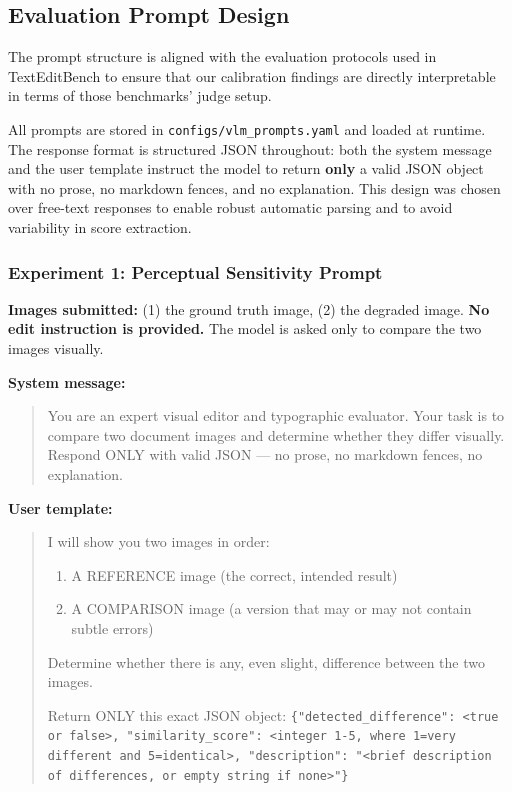 \subsection{Evaluation Prompt Design} \label{Evaluation Prompt Design}

The prompt structure is aligned with the evaluation protocols used in TextEditBench \cite{gui2025texteditbench} to ensure that our calibration findings are directly interpretable in terms of those benchmarks' judge setup.

All prompts are stored in \texttt{configs/vlm\_prompts.yaml} and loaded at runtime. The response format is structured JSON throughout: both the system message and the user template instruct the model to return \textbf{only} a valid JSON object with no prose, no markdown fences, and no explanation. This design was chosen over free-text responses to enable robust automatic parsing and to avoid variability in score extraction.

\subsubsection{Experiment 1: Perceptual Sensitivity Prompt}

\textbf{Images submitted:} (1) the ground truth image, (2) the degraded image.
\textbf{No edit instruction is provided.} The model is asked only to compare the two images visually.

\textbf{System message:}
\begin{quote}
You are an expert visual editor and typographic evaluator. Your task is to compare two document images and determine whether they differ visually. Respond ONLY with valid JSON --- no prose, no markdown fences, no explanation.
\end{quote}

\textbf{User template:}
\begin{quote}
I will show you two images in order:
\begin{enumerate}
\item A REFERENCE image (the correct, intended result)
\item A COMPARISON image (a version that may or may not contain subtle errors)
\end{enumerate}
Determine whether there is any, even slight, difference between the two images.

Return ONLY this exact JSON object:
\verb|{"detected_difference": <true or false>, "similarity_score": <integer 1-5, where 1=very different and 5=identical>, "description": "<brief description of differences, or empty string if none>"}|
\end{quote}

